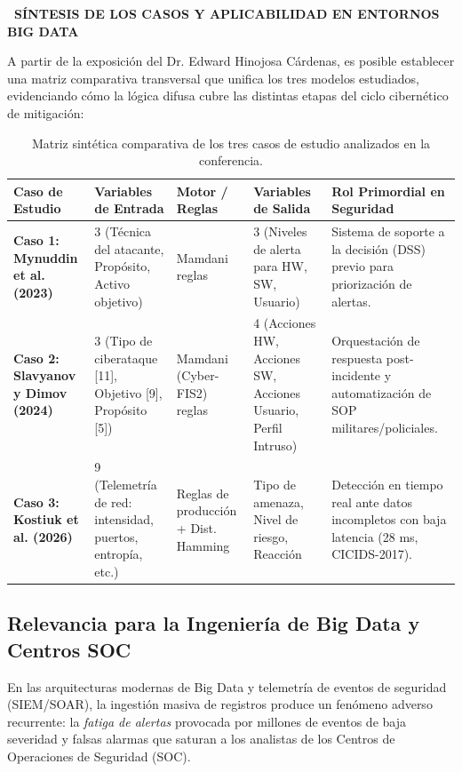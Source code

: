 \documentclass[12pt,a4paper]{article}
\newcommand{\llav}{\symbol{60}\symbol{60}}
\newcommand{\rlav}{\symbol{62}\symbol{62}}
\newcommand{\marcador}[1]{\llav\ #1\ \rlav}
\newcommand{\seccion}[1]{%
  \vspace{0.65cm}%
  {\centering\bfseries\fontsize{12pt}{14pt}\selectfont\marcador{\MakeUppercase{#1}}\par}%
  \vspace{0.30cm}%
}
\begin{document}
\seccion{SÍNTESIS DE LOS CASOS Y APLICABILIDAD EN ENTORNOS BIG DATA}

A partir de la exposición del Dr. Edward Hinojosa Cárdenas, es posible establecer una matriz comparativa transversal que unifica los tres modelos estudiados, evidenciando cómo la lógica difusa cubre las distintas etapas del ciclo cibernético de mitigación:

\begin{table}[H]
\centering
\caption{Matriz sintética comparativa de los tres casos de estudio analizados en la conferencia.}
\label{tab:matriz_casos}
\small
\renewcommand{\arraystretch}{1.25}
\begin{tabularx}{\textwidth}{p{2.3cm} p{3.4cm} p{2.2cm} p{2.2cm} X}
\toprule
\textbf{Caso de Estudio} & \textbf{Variables de Entrada} & \textbf{Motor / Reglas} & \textbf{Variables de Salida} & \textbf{Rol Primordial en Seguridad} \\
\midrule
\textbf{Caso 1: Mynuddin et al. (2023)} &
3 (Técnica del atacante, Propósito, Activo objetivo) &
Mamdani \newline 16 reglas &
3 (Niveles de alerta para HW, SW, Usuario) &
Sistema de soporte a la decisión (DSS) previo para priorización de alertas. \\
\midrule
\textbf{Caso 2: Slavyanov y Dimov (2024)} &
3 (Tipo de ciberataque [11], Objetivo [9], Propósito [5]) &
Mamdani (Cyber-FIS2) \newline 184 reglas &
4 (Acciones HW, Acciones SW, Acciones Usuario, Perfil Intruso) &
Orquestación de respuesta post-incidente y automatización de SOP militares/policiales. \\
\midrule
\textbf{Caso 3: Kostiuk et al. (2026)} &
9 (Telemetría de red: intensidad, puertos, entropía, etc.) &
Reglas de producción + Dist. Hamming &
Tipo de amenaza, Nivel de riesgo, Reacción &
Detección en tiempo real ante datos incompletos con baja latencia (28 ms, CICIDS-2017). \\
\bottomrule
\end{tabularx}
\end{table}

\subsection*{Relevancia para la Ingeniería de Big Data y Centros SOC}
En las arquitecturas modernas de Big Data y telemetría de eventos de seguridad (SIEM/SOAR), la ingestión masiva de registros produce un fenómeno adverso recurrente: la \textit{fatiga de alertas} provocada por millones de eventos de baja severidad y falsas alarmas que saturan a los analistas de los Centros de Operaciones de Seguridad (SOC). 
\end{document}
